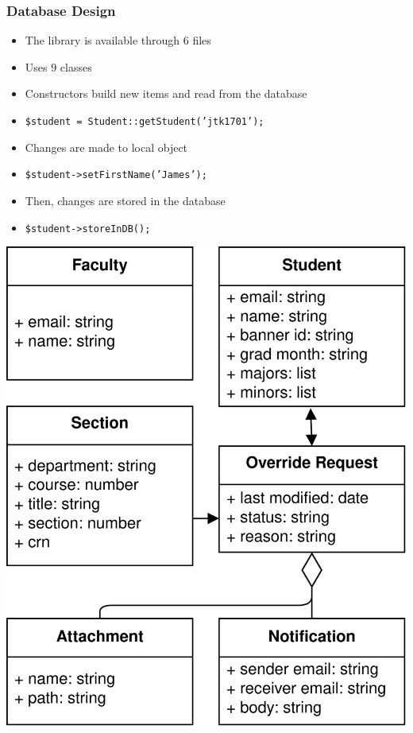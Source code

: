 \documentclass[aspectratio=169, t]{beamer}
\begin{document}
\begin{frame}
\frametitle{Database Design}
\begin{minipage}{0.57\textwidth}
    \begin{itemize}
        \item The library is available through 6 files
        \item Uses 9 classes
        \item Constructors build new items and read from the database
        \item \texttt{\$student = Student::getStudent('jtk1701');}
        \item Changes are made to local object
        \item \texttt{\$student->setFirstName('James');}       
        \item Then, changes are stored in the database
        \item \texttt{\$student->storeInDB();}       
    \end{itemize}
\end{minipage}
\begin{minipage}{0.4\textwidth}
    \includegraphics[width=\textwidth]{assets/database_classes.png}
\end{minipage}
\end{frame}
\end{document}
